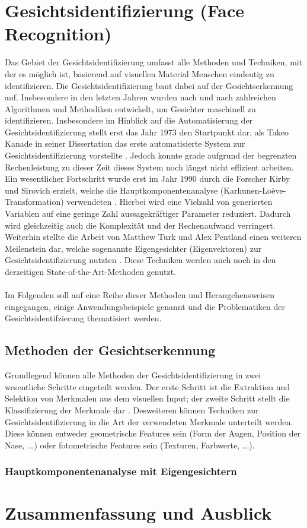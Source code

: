 \documentclass[doktyp=semarbeit, sprache=german]{TUBAFarbeiten}
\begin{document}
\section{Gesichtsidentifizierung (Face Recognition)}\label{identifizierung}
Das Gebiet der Gesichtsidentifizierung umfasst alle Methoden und Techniken, mit der es möglich ist, basierend auf visuellen Material Menschen eindeutig zu identifizieren. Die Gesichtsidentifizierung baut dabei auf der Gesichtserkennung auf. Insbesondere in den letzten Jahren wurden nach und nach zahlreichen Algorithmen und Methodiken entwickelt, um Gesichter maschinell zu identifizieren. Insbesondere im Hinblick auf die Automatisierung der Gesichtsidentifizierung stellt erst das Jahr 1973 den Startpunkt dar, als Takeo Kanade in seiner Dissertation das erste automatisierte System zur Gesichtsidentifizierung vorstellte \cite{Takeo}. Jedoch konnte grade aufgrund der begrenzten Rechenleistung zu dieser Zeit dieses System noch längst nicht effizient arbeiten. Ein wesentlicher Fortschritt wurde erst im Jahr 1990 durch die Forscher Kirby und Sirovich erzielt, welche die Hauptkomponentenanalyse (Karhunen-Loève-Transformation) verwendeten \cite{Kirby}. Hierbei wird eine Vielzahl von generierten Variablen auf eine geringe Zahl aussagekräftiger Parameter reduziert. Dadurch wird gleichzeitig auch die Komplexität und der Rechenaufwand verringert. Weiterhin stellte die Arbeit von Matthew Turk und Alex Pentland einen weiteren Meilenstein dar, welche sogenannte Eigengesichter (Eigenvektoren) zur Gesichtsidentifizierung nutzten \cite{Turk}. Diese Techniken werden auch noch in den derzeitigen State-of-the-Art-Methoden genutzt.
\\\\Im Folgenden soll auf eine Reihe dieser Methoden und Herangehensweisen eingegangen, einige Anwendungsbeispiele genannt und die Problematiken der Gesichtsidentifzierung thematisiert werden.
\subsection{Methoden der Gesichtserkennung}
Grundlegend können alle Methoden der Gesichtsidentifizierung in zwei wesentliche Schritte eingeteilt werden. Der erste Schritt ist die Extraktion und Selektion von Merkmalen aus dem visuellen Input; der zweite Schritt stellt die Klassifizierung der Merkmale dar \cite{FRS}. Desweiteren können Techniken zur Gesichtsidentifizierung in die Art der verwendeten Merkmale unterteilt werden. Diese können entweder geometrische Features sein (Form der Augen, Position der Nase, ...) oder fotometrische Features sein (Texturen, Farbwerte, ...).
\subsubsection{Hauptkomponentenanalyse mit Eigengesichtern}
\section{Zusammenfassung und Ausblick}
\newpage
{}
\end{document}
